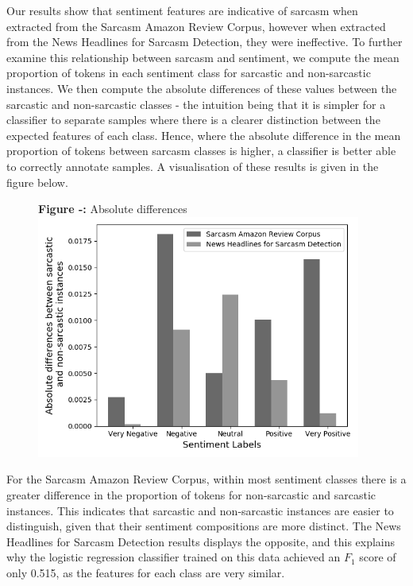 \documentclass[12pt,a4paper]{article}
\begin{document}
\noindent Our results show that sentiment features are indicative of sarcasm when extracted from the Sarcasm Amazon Review Corpus, however when extracted from the News Headlines for Sarcasm Detection, they were ineffective. To further examine this relationship between sarcasm and sentiment, we compute the mean proportion of tokens in each sentiment class for sarcastic and non-sarcastic instances. We then compute the absolute differences of these values between the sarcastic and non-sarcastic classes - the intuition being that it is simpler for a classifier to separate samples where there is a clearer distinction between the expected features of each class. Hence, where the absolute difference in the mean proportion of tokens between sarcasm classes is higher, a classifier is better able to correctly annotate samples. A visualisation of these results is given in the figure below.

\begin{minipage}{0.4\textwidth}
	\begin{figure}[H]
		\begin{center}
			\textbf{Figure -:} Absolute differences\\
			\includegraphics[width=0.95\textwidth]{Images/absolute_differences.png}
			\label{Sarcasm Amazon Review Corpus}
		\end{center}
	\end{figure}
\end{minipage} \hfill
\begin{minipage}{0.6\textwidth}
	For the Sarcasm Amazon Review Corpus, within most sentiment classes there is a greater difference in the proportion of tokens for non-sarcastic and sarcastic instances. This indicates that sarcastic and non-sarcastic instances are easier to distinguish, given that their sentiment compositions are more distinct. The News Headlines for Sarcasm Detection results displays the opposite, and this explains why the logistic regression classifier trained on this data achieved an $F_1$  score of only 0.515, as the features for each class are very similar.
\end{minipage}
\vfill
\end{document}

